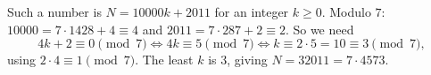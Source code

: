 Such a number is $N=10000k+2011$ for an integer $k\ge0$. Modulo $7$: $10000=7\cdot1428+4\equiv4$ and $2011=7\cdot287+2\equiv2$. So we need
\[
4k+2\equiv0\pmod7\iff4k\equiv5\pmod7\iff k\equiv2\cdot5=10\equiv3\pmod7,
\]
using $2\cdot4\equiv1\pmod7$. The least $k$ is $3$, giving $N=\boxed{32011}=7\cdot4573$.
